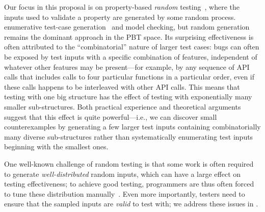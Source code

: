 Our focus in this proposal is on property-based {\em random}
testing~\cite{hamlet1994random}, where the inputs used to validate a
property are generated by some random process.
 enumerative test-case generation~\cite[etc.]{DBLP:conf/haskell/RuncimanNL08, leancheck} and model
checking, but random generation remains the dominant approach in the PBT
space. Its surprising effectiveness is often attributed to the
``combinatorial'' nature of larger test cases: bugs can often be
exposed by test inputs with a specific combination of features,
independent of whatever other features may be present---for example,
by any sequence of API calls that includes calls to four particular
functions in a particular order, even if these calls happens to be
interleaved with other API calls.  This means that testing with one
big structure has the effect of testing with exponentially many
smaller sub-structures. Both practical experience and theoretical
arguments~\cite{HarryPaper} suggest that this effect is quite
powerful---i.e., we can discover small counterexamples by generating
a few larger test inputs containing combinatorially many diverse
sub-structures rather than systematically enumerating test inputs
beginning with the smallest ones.

One well-known challenge of random testing is that some work is often
required to generate {\em well-distributed} random inputs, which can
have a large effect on testing effectiveness; to achieve good testing,
programmers are thus often forced to tune these distribution
manually~\cite{DBLP:conf/icfp/ClaessenH00}. Even more importantly,
testers need to ensure that the sampled inputs are {\em valid} to test
with; we address these issues in .


 

